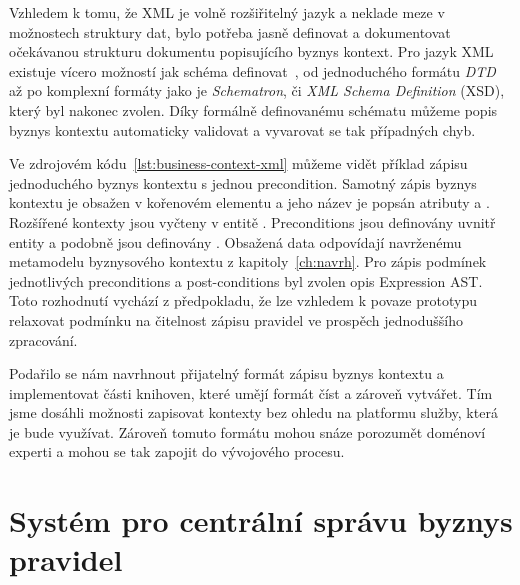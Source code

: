 Vzhledem k tomu, že XML je volně rozšiřitelný jazyk a neklade
meze v možnostech struktury dat, bylo potřeba jasně definovat
a dokumentovat očekávanou strukturu dokumentu popisujícího
byznys kontext. Pro jazyk XML existuje vícero možností jak schéma
definovat~\cite{lee2000comparative}, od jednoduchého formátu
\textit{DTD} až po komplexní formáty jako je \textit{Schematron}, či
\textit{XML Schema Definition} (XSD), který byl nakonec zvolen.
Díky formálně definovanému schématu můžeme popis byznys kontextu
automaticky validovat a vyvarovat se tak případných chyb.

Ve zdrojovém kódu~\ref{lst:business-context-xml} můžeme vidět
příklad zápisu jednoduchého byznys kontextu s jednou precondition.
Samotný zápis byznys kontextu je obsažen v kořenovém elementu
 a jeho název je popsán atributy
 a . Rozšířené kontexty jsou vyčteny
v entitě . Preconditions jsou
definovány uvnitř entity  a podobně
jsou definovány . Obsažená data odpovídají
navrženému metamodelu byznysového kontextu z kapitoly~\ref{ch:navrh}. %
Pro zápis podmínek jednotlivých preconditions a post-conditions byl zvolen
opis Expression AST. Toto rozhodnutí vychází z předpokladu,
že lze vzhledem k povaze prototypu relaxovat podmínku
na čitelnost zápisu pravidel ve prospěch jednoduššího zpracování.

Podařilo se nám navrhnout přijatelný formát zápisu byznys kontextu
a implementovat části knihoven, které umějí formát číst a zároveň vytvářet.
Tím jsme dosáhli možnosti zapisovat kontexty bez ohledu na platformu
služby, která je bude využívat. Zároveň tomuto formátu mohou
snáze porozumět doménoví experti a mohou se tak zapojit do
vývojového procesu.



\section{Systém pro centrální správu byznys pravidel}


